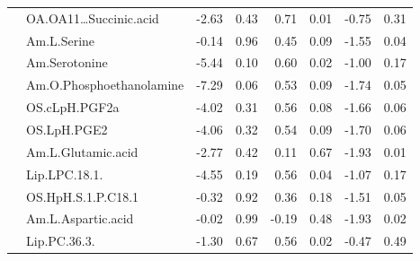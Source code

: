 \documentclass{amsart}
\begin{document}
\begin{table}
\begin{tabular}{clrrrrrr}
 & OA.OA11…Succinic.acid & {\cellcolor[rgb]{0.941,0.816,0.82}}-2.63 & 0.43 & {\cellcolor[rgb]{0.847,0.914,0.804}}0.71 & 0.01 & {\cellcolor[rgb]{0.98,0.945,0.945}}-0.75 & 0.31 \\
 & Am.L.Serine & {\cellcolor[rgb]{0.996,0.988,0.988}}-0.14 & 0.96 & {\cellcolor[rgb]{0.906,0.945,0.875}}0.45 & 0.09 & {\cellcolor[rgb]{0.965,0.89,0.894}}-1.55 & 0.04 \\
 & Am.Serotonine & {\cellcolor[rgb]{0.878,0.62,0.631}}-5.44 & 0.10 & {\cellcolor[rgb]{0.871,0.925,0.831}}0.60 & 0.02 & {\cellcolor[rgb]{0.976,0.929,0.929}}-1.00 & 0.17 \\
 & Am.O.Phosphoethanolamine & {\cellcolor[rgb]{0.835,0.49,0.506}}-7.29 & 0.06 & {\cellcolor[rgb]{0.886,0.937,0.855}}0.53 & 0.09 & {\cellcolor[rgb]{0.961,0.878,0.882}}-1.74 & 0.05 \\
 & OS.cLpH.PGF2a & {\cellcolor[rgb]{0.91,0.718,0.725}}-4.02 & 0.31 & {\cellcolor[rgb]{0.878,0.933,0.843}}0.56 & 0.08 & {\cellcolor[rgb]{0.961,0.882,0.886}}-1.66 & 0.06 \\
 & OS.LpH.PGE2 & {\cellcolor[rgb]{0.91,0.718,0.722}}-4.06 & 0.32 & {\cellcolor[rgb]{0.882,0.933,0.851}}0.54 & 0.09 & {\cellcolor[rgb]{0.961,0.878,0.882}}-1.70 & 0.06 \\
 & Am.L.Glutamic.acid & {\cellcolor[rgb]{0.937,0.804,0.812}}-2.77 & 0.42 & {\cellcolor[rgb]{0.976,0.988,0.969}}0.11 & 0.67 & {\cellcolor[rgb]{0.957,0.863,0.867}}-1.93 & 0.01 \\
 & Lip.LPC.18.1. & {\cellcolor[rgb]{0.898,0.682,0.69}}-4.55 & 0.19 & {\cellcolor[rgb]{0.878,0.933,0.847}}0.56 & 0.04 & {\cellcolor[rgb]{0.973,0.922,0.925}}-1.07 & 0.17 \\
 & OS.HpH.S.1.P.C18.1 & {\cellcolor[rgb]{0.992,0.976,0.976}}-0.32 & 0.92 & {\cellcolor[rgb]{0.925,0.957,0.902}}0.36 & 0.18 & {\cellcolor[rgb]{0.965,0.894,0.894}}-1.51 & 0.05 \\
 & Am.L.Aspartic.acid & {\cellcolor[rgb]{0.996,0.996,0.996}}-0.02 & 0.99 & {\cellcolor[rgb]{0.992,0.984,0.984}}-0.19 & 0.48 & {\cellcolor[rgb]{0.957,0.863,0.867}}-1.93 & 0.02 \\
 & Lip.PC.36.3. & {\cellcolor[rgb]{0.969,0.91,0.91}}-1.30 & 0.67 & {\cellcolor[rgb]{0.878,0.933,0.843}}0.56 & 0.02 & {\cellcolor[rgb]{0.988,0.965,0.965}}-0.47 & 0.49 \\ \bottomrule
\end{tabular}
\end{table}

\clearpage
\end{document}
